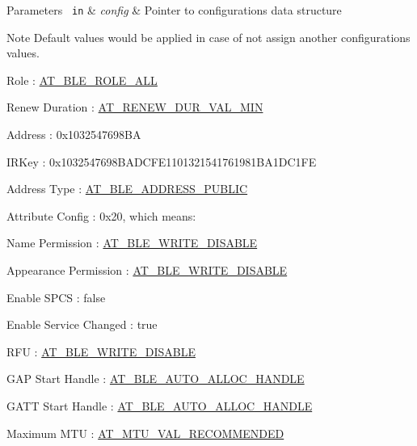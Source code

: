 \begin{DoxyParams}[1]{Parameters}
\mbox{\texttt{ in}}  & {\em config} & Pointer to configurations data structure\\
\hline
\end{DoxyParams}
\begin{DoxyNote}{Note}
Default values would be applied in case of not assign another configurations values.
\begin{DoxyItemize}
\item Role \+: \mbox{\hyperlink{at__ble__api_8h_ad15e38aadd54f5fc3ab8a75b35ae476aa2ac7617aa32b02150b9db1761c595978}{A\+T\+\_\+\+B\+L\+E\+\_\+\+R\+O\+L\+E\+\_\+\+A\+LL}}
\item Renew Duration \+: \mbox{\hyperlink{at__ble__api_8h_a50b36406164b418c4de24014c3bf2a7d}{A\+T\+\_\+\+R\+E\+N\+E\+W\+\_\+\+D\+U\+R\+\_\+\+V\+A\+L\+\_\+\+M\+IN}}
\item Address \+: 0x1032547698\+BA
\item I\+R\+Key \+: 0x1032547698\+B\+A\+D\+C\+F\+E1101321541761981\+B\+A1\+D\+C1\+FE
\item Address Type \+: \mbox{\hyperlink{at__ble__api_8h_aab076e537bd99ea1be0fbf95a2d16be4abcbf9f9edf645c939206d4b4c4045ca9}{A\+T\+\_\+\+B\+L\+E\+\_\+\+A\+D\+D\+R\+E\+S\+S\+\_\+\+P\+U\+B\+L\+IC}}
\item Attribute Config \+: 0x20, which means\+:
\begin{DoxyEnumerate}
\item Name Permission \+: \mbox{\hyperlink{at__ble__api_8h_acd9a0371335811dbc90e98a7802a8968ad5b68af5e4ebdae35af30f67e0e71e99}{A\+T\+\_\+\+B\+L\+E\+\_\+\+W\+R\+I\+T\+E\+\_\+\+D\+I\+S\+A\+B\+LE}}
\item Appearance Permission \+: \mbox{\hyperlink{at__ble__api_8h_acd9a0371335811dbc90e98a7802a8968ad5b68af5e4ebdae35af30f67e0e71e99}{A\+T\+\_\+\+B\+L\+E\+\_\+\+W\+R\+I\+T\+E\+\_\+\+D\+I\+S\+A\+B\+LE}}
\item Enable S\+P\+CS \+: false
\item Enable Service Changed \+: true
\item R\+FU \+: \mbox{\hyperlink{at__ble__api_8h_acd9a0371335811dbc90e98a7802a8968ad5b68af5e4ebdae35af30f67e0e71e99}{A\+T\+\_\+\+B\+L\+E\+\_\+\+W\+R\+I\+T\+E\+\_\+\+D\+I\+S\+A\+B\+LE}}
\end{DoxyEnumerate}
\item G\+AP Start Handle \+: \mbox{\hyperlink{at__ble__api_8h_a006780a0fa215bc901071f44a732758e}{A\+T\+\_\+\+B\+L\+E\+\_\+\+A\+U\+T\+O\+\_\+\+A\+L\+L\+O\+C\+\_\+\+H\+A\+N\+D\+LE}}
\item G\+A\+TT Start Handle \+: \mbox{\hyperlink{at__ble__api_8h_a006780a0fa215bc901071f44a732758e}{A\+T\+\_\+\+B\+L\+E\+\_\+\+A\+U\+T\+O\+\_\+\+A\+L\+L\+O\+C\+\_\+\+H\+A\+N\+D\+LE}}
\item Maximum M\+TU \+: \mbox{\hyperlink{at__ble__api_8h_a79ac5175ec942978c613c003af4d3ce6}{A\+T\+\_\+\+M\+T\+U\+\_\+\+V\+A\+L\+\_\+\+R\+E\+C\+O\+M\+M\+E\+N\+D\+ED}}
\end{DoxyItemize}
\end{DoxyNote}
